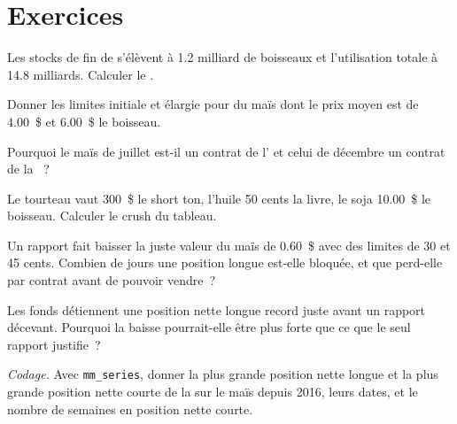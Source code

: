 \section{Exercices}

\begin{exercise}[$\star$]\label{exo:m3:agriculturals-and-softs:1}
Les stocks de fin de  s'élèvent à 1.2 milliard de boisseaux et l'utilisation totale à 14.8 milliards. Calculer le .
\end{exercise}

\begin{exercise}[$\star$]\label{exo:m3:agriculturals-and-softs:2}
Donner les limites initiale et élargie pour du maïs dont le prix moyen est de 4.00~\$ et 6.00~\$ le boisseau.
\end{exercise}

\begin{exercise}[$\star$]\label{exo:m3:agriculturals-and-softs:3}
Pourquoi le maïs de juillet est-il un contrat de l' et celui de décembre un contrat de la ~?
\end{exercise}

\begin{exercise}[$\star\star$]\label{exo:m3:agriculturals-and-softs:4}
Le tourteau vaut 300~\$ le short ton, l'huile 50 cents la livre, le soja 10.00~\$ le boisseau. Calculer le crush du tableau.
\end{exercise}

\begin{exercise}[$\star\star$]\label{exo:m3:agriculturals-and-softs:5}
Un rapport fait baisser la juste valeur du maïs de 0.60~\$ avec des limites de 30 et 45 cents. Combien de jours une position longue
est-elle bloquée, et que perd-elle par contrat avant de pouvoir vendre~?
\end{exercise}

\begin{exercise}[$\star\star$]\label{exo:m3:agriculturals-and-softs:6}
Les fonds détiennent une position nette longue record juste avant un rapport décevant. Pourquoi la baisse pourrait-elle être
plus forte que ce que le seul rapport justifie~?
\end{exercise}

\begin{exercise}[$\star\star\star$]\label{exo:m3:agriculturals-and-softs:7}
\emph{Codage.} Avec \texttt{mm\_series}, donner la plus grande position nette longue et la plus grande position nette courte
de la  sur le maïs depuis 2016, leurs dates, et le nombre de semaines en position nette courte.
\end{exercise}

